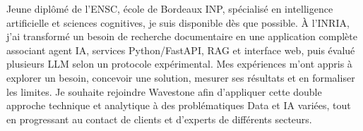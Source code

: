 
\begin{cvparagraph}
Jeune diplômé de l’ENSC, école de Bordeaux INP, spécialisé en intelligence artificielle et sciences cognitives, je suis disponible dès que possible. À l’INRIA, j’ai transformé un besoin de recherche documentaire en une application complète associant agent IA, services Python/FastAPI, RAG et interface web, puis évalué plusieurs LLM selon un protocole expérimental. Mes expériences m’ont appris à explorer un besoin, concevoir une solution, mesurer ses résultats et en formaliser les limites. Je souhaite rejoindre Wavestone afin d’appliquer cette double approche technique et analytique à des problématiques Data et IA variées, tout en progressant au contact de clients et d’experts de différents secteurs.
\end{cvparagraph}
